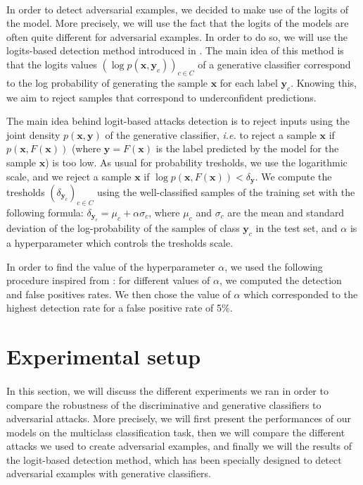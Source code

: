 \documentclass[10pt,twocolumn,letterpaper]{article}
\begin{document}
\paragraph{} In order to detect adversarial examples, we decided to make use of the logits of the model. More precisely, we will use the fact that the logits of the models are often quite different for adversarial examples. In order to do so, we will use the logits-based detection method introduced in \cite{main_paper}. The main idea of this method is that the logits values $(\log{p(\bm{x}, \bm{y}_c)})_{c \in C}$ of a generative classifier correspond to the log probability of generating the sample $\bm{x}$ for each label $\bm{y}_c$. Knowing this, we aim to reject samples that correspond to underconfident predictions. 

The main idea behind logit-based attacks detection is to reject inputs using the joint density $p(\bm{x}, \bm{y})$ of the generative classifier, \textit{i.e.} to reject a sample $\bm{x}$ if $p(\bm{x}, F(\bm{x}))$ (where $\bm{y} = F(\bm{x})$ is the label predicted by the model for the sample $\bm{x}$) is too low. As usual for probability tresholds, we use the logarithmic scale, and we reject a sample $\bm{x}$ if $\log{p(\bm{x}, F(\bm{x}))} < \delta_{\bm{y}}$. We compute the tresholds $(\delta_{\bm{y}_c})_{c \in C}$ using the well-classified samples of the training set with the following formula: $\delta_{\bm{y}_c} = \mu_c + \alpha \sigma_c$, where $\mu_c$ and $\sigma_c$ are the mean and standard deviation of the log-probability of the samples of class $\bm{y}_c$ in the test set, and $\alpha$ is a hyperparameter which controls the tresholds scale.

In order to find the value of the hyperparameter $\alpha$, we used the following procedure inspired from \cite{main_paper}: for different values of $\alpha$, we computed the detection and false positives rates. We then chose the value of $\alpha$ which corresponded to the highest detection rate for a false positive rate of 5\%.

\section{Experimental setup}
\label{sec:setup}

\paragraph{} In this section, we will discuss the different experiments we ran in order to compare the robustness of the discriminative and generative classifiers to adversarial attacks. More precisely, we will first present the performances of our models on the multiclass classification task, then we will compare the different attacks we used to create adversarial examples, and finally we will the results of the logit-based detection method, which has been specially designed to detect adversarial examples with generative classifiers. 
\end{document}
